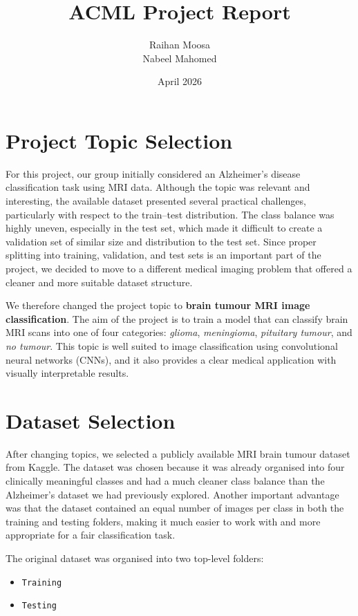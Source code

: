 \documentclass{article}
\title{ACML Project Report}
\author{Raihan Moosa \\ Nabeel Mahomed}
\date{April 2026}
\begin{document}
\maketitle

\section{Project Topic Selection}

For this project, our group initially considered an Alzheimer's disease classification task using MRI data. Although the topic was relevant and interesting, the available dataset presented several practical challenges, particularly with respect to the train--test distribution. The class balance was highly uneven, especially in the test set, which made it difficult to create a validation set of similar size and distribution to the test set. Since proper splitting into training, validation, and test sets is an important part of the project, we decided to move to a different medical imaging problem that offered a cleaner and more suitable dataset structure.

We therefore changed the project topic to \textbf{brain tumour MRI image classification}. The aim of the project is to train a model that can classify brain MRI scans into one of four categories: \textit{glioma}, \textit{meningioma}, \textit{pituitary tumour}, and \textit{no tumour}. This topic is well suited to image classification using convolutional neural networks (CNNs), and it also provides a clear medical application with visually interpretable results.

\section{Dataset Selection}

After changing topics, we selected a publicly available MRI brain tumour dataset from Kaggle. The dataset was chosen because it was already organised into four clinically meaningful classes and had a much cleaner class balance than the Alzheimer's dataset we had previously explored. Another important advantage was that the dataset contained an equal number of images per class in both the training and testing folders, making it much easier to work with and more appropriate for a fair classification task.

The original dataset was organised into two top-level folders:

\begin{itemize}
    \item \texttt{Training}
    \item \texttt{Testing}
\end{itemize}
\end{document}
